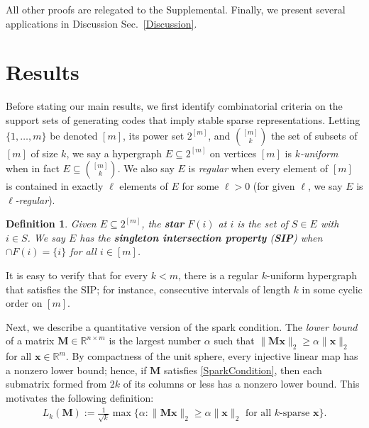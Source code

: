 \documentclass[9pt,twocolumn]{pnas-new}
\newtheorem{proposition}{Proposition}
\newtheorem{definition}{Definition}
\begin{document}
All other proofs are relegated to the Supplemental. 
Finally, we present several applications in Discussion Sec.~\ref{Discussion}. 

\section{Results}\label{Results}

Before stating our main results, we first identify combinatorial criteria on the support sets of generating codes that imply stable sparse representations.  Letting $\{1, \ldots, m\}$ be denoted $[m]$, its power set $2^{[m]}$, and ${[m] \choose k}$ the set of subsets of $[m]$ of size $k$,
we say a hypergraph $E \subseteq 2^{[m]}$ on vertices $[m]$ is \textit{$k$-uniform} when in fact $E \subseteq {[m] \choose k}$. We also say $E$ is \emph{regular} when every element of $[m]$ is contained in exactly $\ell$ elements of $E$ for some $\ell > 0$ (for given $\ell$, we say $E$ is \textit{$\ell$-regular}).

\begin{definition}\label{sip}
Given $E \subseteq 2^{[m]}$, the \textbf{star} $F(i)$ at $i$ is the set of $S \in E$ with $i \in S$. We say $E$ has the \textbf{singleton intersection property} (\textbf{SIP}) when $\cap F(i) = \{i\}$ for all $i \in [m]$. 
\end{definition}

It is easy to verify that for every $k < m$, there is a regular $k$-uniform hypergraph that satisfies the SIP; for instance, consecutive intervals of length $k$ in some cyclic order on $[m]$.

Next, we describe a quantitative version of the spark condition.  %
The \emph{lower bound} \cite{Grcar10} of a matrix $\mathbf{M} \in \mathbb R^{n \times m}$ is the largest number $\alpha$ such that \mbox{$\|\mathbf{M}\mathbf{x}\|_2 \geq \alpha\|\mathbf{x}\|_2$} for all $\mathbf{x} \in \mathbb{R}^m$. By compactness of the unit sphere, every injective linear map has a nonzero lower bound; hence, if $\mathbf{M}$ satisfies \eqref{SparkCondition}, then each submatrix formed from $2k$ of its columns or less has a nonzero lower bound. This motivates the following definition: %
\begin{align*}
L_k(\mathbf{M}) := \frac{1}{\sqrt{k}}\max \{ \alpha : \|\mathbf{M}\mathbf{x}\|_2 \geq \alpha\|\mathbf{x}\|_2 \text{ for all $k$-sparse } \mathbf{x}\}.
\end{align*} 
\end{document}
